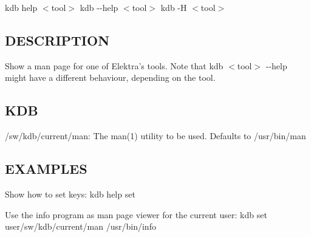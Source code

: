 {\ttfamily kdb help $<$tool$>$} {\ttfamily kdb -\/-\/help $<$tool$>$} {\ttfamily kdb -\/\+H $<$tool$>$}

\subsection*{D\+E\+S\+C\+R\+I\+P\+T\+I\+O\+N}

Show a man page for one of Elektra's tools. Note that {\ttfamily kdb $<$tool$>$ -\/-\/help} might have a different behaviour, depending on the tool.

\subsection*{K\+D\+B}


\begin{DoxyItemize}
\item {\ttfamily /sw/kdb/current/man}\+: The man(1) utility to be used. Defaults to /usr/bin/man
\end{DoxyItemize}

\subsection*{E\+X\+A\+M\+P\+L\+E\+S}

Show how to set keys\+: {\ttfamily kdb help set}

Use the info program as man page viewer for the current user\+: {\ttfamily kdb set user/sw/kdb/current/man /usr/bin/info} 